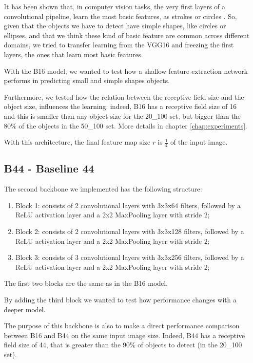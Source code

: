 \documentclass[a4paper,10pt]{report}
\begin{document}
It has been shown that, in computer vision tasks, the very first layers of a convolutional pipeline, learn the most basic features, as strokes or circles \cite{cnn-features}.
So, given that the objects we have to detect have simple shapes, like circles or ellipses, and that we think these kind of basic feature are common across different domains, 
we tried to transfer learning from the VGG16 and freezing the first layers, the ones that learn most basic features.

With the B16 model, we wanted to test how a shallow feature extraction network performs in predicting small and simple shapes objects.

Furthermore, we tested how the relation between the receptive field size and the object size, influences the learning: indeed, B16 has a receptive field size of 16 and this is smaller than any object size for the 20\_100 set, but bigger than the 80\% of the objects in the 50\_100 set. More details in chapter \ref{chap:experiments}.

With this architecture, the final feature map size $r$ is $\frac{1}{4}$ of the input image.

\subsection{B44 - Baseline 44}\label{subsec:b44}
The second backbone we implemented has the following structure:
\begin{enumerate}
  \item Block 1: consists of 2 convolutional layers with 3x3x64 filters, followed by a ReLU activation layer and a 2x2 MaxPooling layer with stride 2;
  \item Block 2: consists of 2 convolutional layers with 3x3x128 filters, followed by a ReLU activation layer and a 2x2 MaxPooling layer with stride 2;
  \item Block 3: consists of 3 convolutional layers with 3x3x256 filters, followed by a ReLU activation layer and a 2x2 MaxPooling layer with stride 2;
\end{enumerate}
The first two blocks are the same as in the B16 model. 

By adding the third block we wanted to test how performance changes with a deeper model.

The purpose of this backbone is also to make a direct performance comparison between B16 and B44 on the same input image size. Indeed, B44 has a receptive field size of 44, that is greater than the 90\% of objects to detect (in the 20\_100 set).
\end{document}
